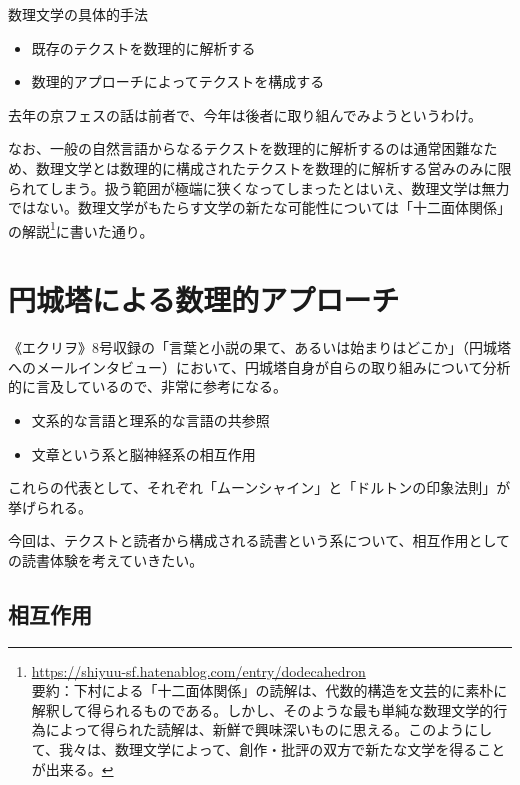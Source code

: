 \documentclass[10pt, a5paper, twoside]{jsarticle}
\theoremstyle{definition}
\begin{document}
		数理文学の具体的手法

		\begin{itemize}
			
			\item 既存のテクストを数理的に解析する
			
			\item 数理的アプローチによってテクストを構成する
		
		\end{itemize}

		去年の京フェスの話は前者で、今年は後者に取り組んでみようというわけ。

		なお、一般の自然言語からなるテクストを数理的に解析するのは通常困難なため、数理文学とは数理的に構成されたテクストを数理的に解析する営みのみに限られてしまう。扱う範囲が極端に狭くなってしまったとはいえ、数理文学は無力ではない。数理文学がもたらす文学の新たな可能性については「十二面体関係」の解説\footnote{\url{https://shiyuu-sf.hatenablog.com/entry/dodecahedron} \\ 要約：下村による「十二面体関係」の読解は、代数的構造を文芸的に素朴に解釈して得られるものである。しかし、そのような最も単純な数理文学的行為によって得られた読解は、新鮮で興味深いものに思える。このようにして、我々は、数理文学によって、創作・批評の双方で新たな文学を得ることが出来る。}に書いた通り。

	\section{円城塔による数理的アプローチ}

		《エクリヲ》8号収録の「言葉と小説の果て、あるいは始まりはどこか」\cite{ecrito}（円城塔へのメールインタビュー）において、円城塔自身が自らの取り組みについて分析的に言及しているので、非常に参考になる。

		\begin{itemize}

			\item 文系的な言語と理系的な言語の共参照

			\item 文章という系と脳神経系の相互作用

		\end{itemize}

		これらの代表として、それぞれ「ムーンシャイン」と「ドルトンの印象法則」が挙げられる。

		今回は、テクストと読者から構成される読書という系について、相互作用としての読書体験を考えていきたい。

		\subsection{相互作用}
\end{document}
